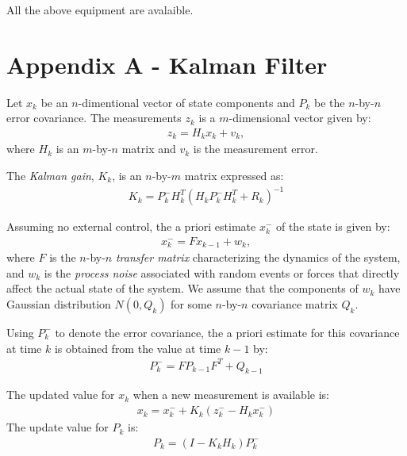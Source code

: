 All the above equipment are avalaible.

\section{Appendix A - Kalman Filter}
Let $x_k$ be an $n$-dimentional vector of state components and $P_k$ be the
$n$-by-$n$ error covariance. The measurements $z_k$ is a $m$-dimensional
vector given by:
\begin{align*}
z_k = H_kx_k + v_k,
\end{align*}
where $H_k$ is an $m$-by-$n$ matrix and $v_k$ is the measurement error.

The \textit{Kalman gain}, $K_k$, is an $n$-by-$m$ matrix expressed as:
\begin{align*}
K_k = P_k^-H_k^T(H_kP_k^-H_k^T + R_k)^{-1}
\end{align*}

Assuming no external control, the a priori estimate $x_k^-$ of the state is
given by:
\begin{align*}
x_k^- = Fx_{k - 1} + w_k,
\end{align*}
where $F$ is the $n$-by-$n$ \textit{transfer matrix} characterizing the
dynamics of the system, and $w_k$ is the \textit{process noise} associated with
random events or forces that directly affect the actual state of the system. We assume that the components of $w_k$
have Gaussian distribution $N(0, Q_k)$ for some $n$-by-$n$ covariance matrix
$Q_k$.

Using $P_k^-$ to denote the error covariance, the a priori estimate for this
covariance at time $k$ is obtained from the value at time $k - 1$ by:
\begin{align*}
P_k^- = FP_{k - 1}F^T + Q_{k - 1}
\end{align*}

The updated value for $x_k$ when a new measurement is available is:
\begin{align*}
x_k = x_k^- + K_k(z_k^- - H_kx_k^-)
\end{align*}
The update value for $P_k$ is:
\begin{align*}
P_k = (I - K_kH_k)P_k^-
\end{align*}
